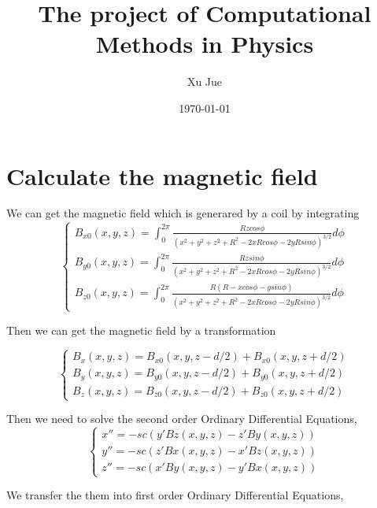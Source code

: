 \documentclass[12pt]{article}
\begin{document}
\title{The project of Computational Methods in Physics}
\author{Xu Jue}
\date{\today}
\maketitle

\section{Calculate the magnetic field }

\indent

We can get the magnetic field which is generared by a coil by integrating
\begin{equation}
\begin{cases}
        B_{x0}(x,y,z)=\int_0^{2 \pi} \frac{Rzcos \phi}{(x^2+y^2+z^2+R^2-2xRcos \phi-2yRsin \phi)^{3/2}} d\phi\\
        B_{y0}(x,y,z)=\int_0^{2 \pi} \frac{Rzsin \phi}{(x^2+y^2+z^2+R^2-2xRcos \phi-2yRsin \phi)^{3/2}} d\phi\\
        B_{z0}(x,y,z)=\int_0^{2 \pi} \frac{R(R-xcos\phi-ysin\phi)}{(x^2+y^2+z^2+R^2-2xRcos \phi-2yRsin \phi)^{3/2}} d\phi
\end{cases}
\end{equation}


 Then we can get the magnetic field by a transformation

 \begin{equation}
 \begin{cases}
        B_{x}(x,y,z)=B_{x0}(x,y,z-d/2)+B_{x0}(x,y,z+d/2)\\
        B_{y}(x,y,z)=B_{y0}(x,y,z-d/2)+B_{y0}(x,y,z+d/2)\\
        B_{z}(x,y,z)=B_{z0}(x,y,z-d/2)+B_{z0}(x,y,z+d/2)
 \end{cases}
 \end{equation}


 Then we need to solve the second order Ordinary Diﬀerential Equations,
\begin{equation}
    \begin{cases}
        x''=-sc(y'Bz(x,y,z)-z'By(x,y,z))\\
        y''=-sc(z'Bx(x,y,z)-x'Bz(x,y,z))\\
        z''=-sc(x'By(x,y,z)-y'Bx(x,y,z))
    \end{cases}
\end{equation}

We transfer the them into first order Ordinary Diﬀerential Equations,
\end{document}

